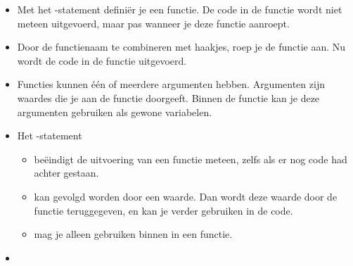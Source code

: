\begin{itemize}
	\item
		\newline
		Met het -statement defini\"er je een functie.
		De code in de functie wordt niet meteen uitgevoerd,
		maar pas wanneer je deze functie aanroept.
	\item
		\newline
		Door de functienaam te combineren met haakjes,
		roep je de functie aan.
		Nu wordt de code in de functie uitgevoerd.
	\item
		\newline
		Functies kunnen \'e\'en of meerdere argumenten hebben.
		Argumenten zijn waardes die je aan de functie doorgeeft.
		Binnen de functie kan je deze argumenten gebruiken als gewone variabelen.
	\item
		\newline
		Het -statement
		\begin{itemize}
			\item
				be\"eindigt de uitvoering van een functie meteen,
				zelfs als er nog code had achter gestaan.
			\item
				kan gevolgd worden door een waarde.
				Dan wordt deze waarde door de functie teruggegeven,
				en kan je verder gebruiken in de code. %
			\item
				mag je alleen gebruiken binnen in een functie.
		\end{itemize}
	\item

\end{itemize}
